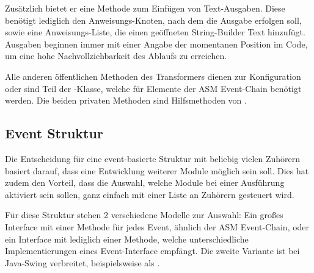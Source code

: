 Zusätzlich bietet er eine Methode zum Einfügen von Text-Ausgaben. Diese benötigt lediglich den Anweisungs-Knoten, nach dem die Ausgabe erfolgen soll, sowie eine Anweisungs-Liste, die einen geöffneten String-Builder Text hinzufügt. Ausgaben beginnen immer mit einer Angabe der momentanen Position im Code, um eine hohe Nachvollziehbarkeit des Ablaufs zu erreichen.

Alle anderen öffentlichen Methoden des Transformers dienen zur Konfiguration oder sind Teil der -Klasse, welche für Elemente der ASM Event-Chain benötigt werden. Die beiden privaten Methoden sind Hilfsmethoden von .

\subsection{Event Struktur} 

Die Entscheidung für eine event-basierte Struktur mit beliebig vielen Zuhörern basiert darauf, dass eine Entwicklung weiterer Module möglich sein soll. Dies hat zudem den Vorteil, dass die Auswahl, welche Module bei einer Ausführung aktiviert sein sollen, ganz einfach mit einer Liste an Zuhörern gesteuert wird.

Für diese Struktur stehen 2 verschiedene Modelle zur Auswahl: Ein großes Interface mit einer Methode für jedes Event, ähnlich der ASM Event-Chain, oder ein Interface mit lediglich einer Methode, welche unterschiedliche Implementierungen eines Event-Interface empfängt. Die zweite Variante ist bei Java-Swing verbreitet, beispielsweise als .

